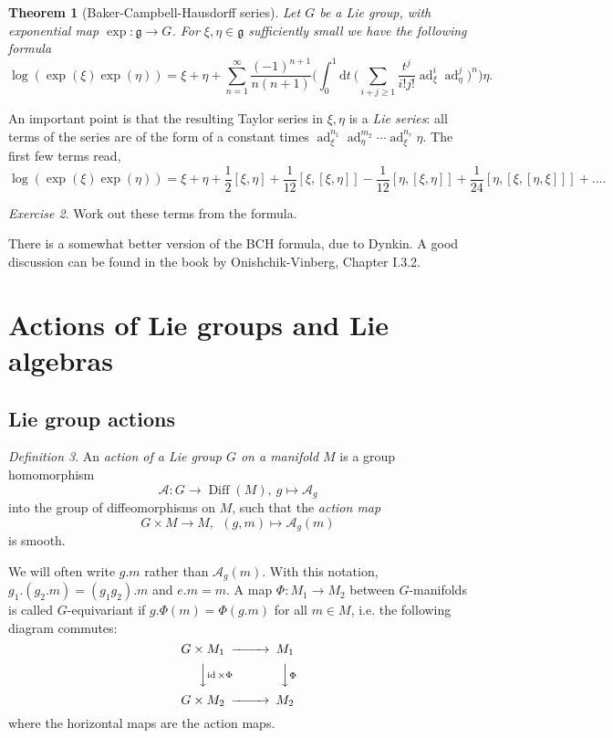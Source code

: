 \documentclass{article}
\newtheorem{theorem}{Theorem}[section]
\theoremstyle{remark}
\newtheorem{exercise}[theorem]{Exercise}
\newtheorem{definition}[theorem]{Definition}
\newcommand\A{\mathcal{A}}
\newcommand\lie[1]{\mathfrak{#1}}
\newcommand{\g}{\lie{g}}
\newcommand{\on}{\operatorname}
\newcommand{\ad}{ \on{ad} }
\renewcommand{\d}{{\mbox{d}}}
\newcommand{\f}{\frac}
\newcommand{\hh}{{\textstyle \f{1}{2}}}
\newcommand{\ca}{\mathcal}
\begin{document}
\begin{theorem}[Baker-Campbell-Hausdorff series] Let $G$ be a Lie group, with exponential map $\exp\colon\g\to G$. For $\xi,\eta\in\g$ sufficiently small we have the following formula
\[  \log(\exp(\xi)\exp(\eta))=\xi+\eta+\sum_{n=1}^\infty \f{(-1)^{n+1} }{n(n+1)}\Big(\int_0^1\d t\ \Big(\sum_{i+j\ge 1} \f{t^j}{i! j!}\ad_\xi^i \ad_\eta^j \Big)^n\Big)\eta.\]
\end{theorem}
%
An important point is that the resulting Taylor series in $\xi,\eta$ 
is a \emph{Lie series}: all terms of the series are of the form of a constant times $\ad_\xi^{n_1}\ad_\eta^{m_2}\cdots \ad_\xi^{n_r}\eta$. 
The first few terms read, 
\[  \log(\exp(\xi)\exp(\eta))=\xi+\eta+\hh [\xi,\eta]+\f{1}{12}[\xi,[\xi,\eta]]-\f{1}{12}[\eta,[\xi,\eta]]+
\f{1}{24} [\eta,[\xi,[\eta,\xi]]]+
\ldots.\]
%
\begin{exercise}
Work out these terms from the formula. 
\end{exercise}
%
There is a somewhat better version of the BCH formula, due to Dynkin.
A good discussion can be found in the book by Onishchik-Vinberg, Chapter I.3.2.  


\section{Actions of Lie groups and Lie algebras}
\subsection{Lie group actions}
%
\begin{definition}
An {\em action of a Lie group $G$ on a manifold $M$} is a group 
homomorphism 
%
$$\A\colon G\to \on{Diff}(M),\ g\mapsto \ca{A}_g$$ 
%
into the group of diffeomorphisms
on $M$, such that the {\em action map} 
%
$$  G\times M\to M,\ \ (g,m)\mapsto \A_g(m)$$
%
is smooth.
\end{definition}
%
We will often write $g.m$ rather than $\A_g(m)$. With this notation, 
$g_1.(g_2.m)=(g_1g_2).m$ and $e.m=m$. A map $\Phi\colon M_1\to M_2$ between $G$-manifolds is called 
$G$-equivariant if $g.\Phi(m)=\Phi(g.m)$ for all $m\in M$, i.e. the following diagram commutes:
\[ \begin{CD}
G\times M_1 @>>> M_1\\
@VV{\on{id}\times \Phi}V @VV{\Phi}V\\
G\times M_2 @>>> M_2
\end{CD}\]
where the horizontal maps are the action maps. 
\end{document}
